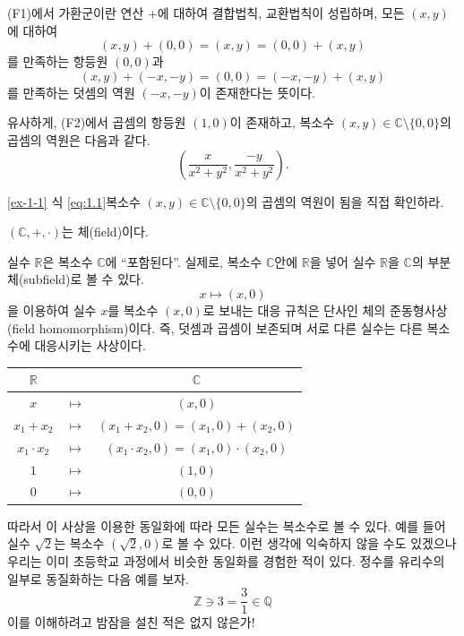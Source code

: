 (F1)에서 가환군이란
연산 $+$에 대하여 결합법칙, 교환법칙이 성립하며,
모든 $(x,y)$에 대하여
$$
(x,y) + (0,0) = (x,y) = (0,0) + (x,y)
$$
를 만족하는 
항등원 $(0,0)$과 
$$
(x,y) + (-x,-y) = (0,0) = (-x,-y) + (x,y)
$$
를 만족하는 덧셈의 역원 $(-x, -y)$이  존재한다는 뜻이다.

유사하게, (F2)에서 곱셈의 항등원 $(1,0)$이 존재하고, 복소수 $(x,y) \in \mathbb C \setminus\{0,0\}$의
곱셈의 역원은 다음과 같다.
\begin{equation} \label{eq:1.1}
\left( \dfrac{x}{x^2+y^2}, \dfrac{-y}{x^2+y^2} \right).
\end{equation}

\begin{salt_exercise} \ref{ex-1-1}
식 \eqref{eq:1.1}\이 복소수 $(x,y) \in \mathbb C \setminus\{0,0\}$의 곱셈의 역원이 됨을 직접 확인하라.
\end{salt_exercise}


\begin{salt_prop}
$(\mathbb C, +, \cdot)$는 체(field)이다.
\end{salt_prop}

실수  $\mathbb R$은 복소수 $\mathbb C$에 ``포함된다''.
실제로, 복소수 $\mathbb C$안에 $\mathbb R$을 넣어
실수 $\mathbb R$을 $\mathbb C$의 부분체(subfield)로 볼 수 있다.
$$
x \mapsto (x,0)
$$
을 이용하여 실수 $x$를 복소수 $(x,0)$로 보내는 대응 규칙은
단사인 체의 준동형사상(field homomorphism)이다.
즉, 덧셈과 곱셈이 보존되며 서로 다른 실수는 다른 복소수에 대응시키는 사상이다.

\begin{center}
\begin{tabular}{|ccc|} \hline
$\mathbb R$ & & $\mathbb C$ \\ \hline \hline
$x$ & $\mapsto$ & $(x,0)$ \\ 
$x_1+x_2$ & $\mapsto$ & $(x_1+x_2,0) = (x_1,0) + (x_2,0)$ \\ 
$x_1\cdot x_2$ & $\mapsto$ & $(x_1\cdot x_2,0) = (x_1,0) \cdot (x_2,0)$ \\ 
$1$ & $\mapsto$ & $(1,0)$ \\
$0$ & $\mapsto$ & $(0,0)$ \\
\hline
\end{tabular}
\end{center}

따라서 이 사상을 이용한 동일화에 따라 모든 실수는 복소수로 볼 수 있다.
예를 들어 실수 $\sqrt{2}$는 복소수 $(\sqrt{2},0)$로 볼 수 있다.
이런 생각에 익숙하지 않을 수도 있겠으나 우리는 이미 초등학교 과정에서
비슷한 동일화를 경험한 적이 있다. 정수를 유리수의 일부로 동질화하는
다음 예를 보자.
$$
\mathbb Z  \ni 3 = \frac31 \in \mathbb Q
$$
이를 이해하려고 밤잠을 설친 적은 없지 않은가!

